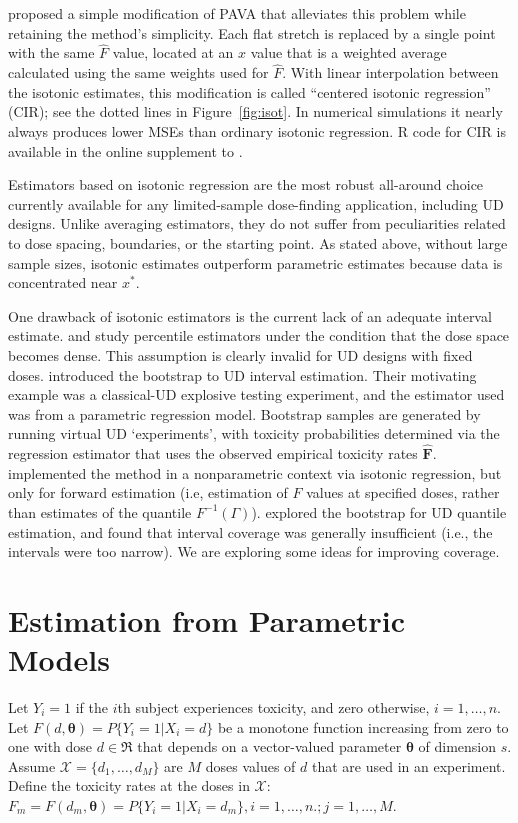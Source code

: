  \cite{Oron07} proposed a simple modification of PAVA that alleviates this problem while retaining the method's simplicity. Each flat stretch is replaced by a single point with the same $\hat{F}$ value, located at an $x$ value that is a weighted average calculated using the same weights used for $\hat{F}$. With linear interpolation between the isotonic estimates, this modification is called ``centered isotonic regression'' (CIR); see the dotted lines in Figure~\ref{fig:isot}. In numerical simulations it nearly always produces lower MSEs than ordinary isotonic regression. R code for CIR is available in the online supplement to \cite{Oron:Hoff:smal:2013}.

Estimators based on isotonic regression are the most robust all-around choice currently available for any limited-sample dose-finding application, including UD designs. Unlike averaging estimators, they do not suffer from peculiarities related to dose spacing, boundaries, or the starting point. As stated above, without large sample sizes, isotonic estimates outperform parametric estimates because  data is concentrated near $x^*$.

One  drawback of isotonic estimators is the current lack of an adequate interval estimate.  \cite{Wright:1984} and \cite{Muke:1993} study percentile estimators under the condition that the dose space becomes dense.  This assumption is clearly invalid for UD designs with fixed doses.  \cite{Chao:Fuh:boot:2001} introduced the bootstrap to UD interval estimation. Their motivating example was a classical-UD explosive testing experiment, and the estimator used was from a parametric regression model. Bootstrap samples are generated by running virtual UD `experiments', with toxicity probabilities determined via the regression estimator that uses the observed empirical toxicity rates $\mathbf{\hat{F}}$.  \cite{Styl:Pros:Flou:esti:2003} implemented the method in a nonparametric context via isotonic regression, but only for forward estimation (i.e, estimation of $F$ values at specified doses, rather than estimates of the quantile $F^{-1}(\Gamma)$). \cite{Oron07} explored the bootstrap for UD quantile estimation, and found that interval coverage was generally insufficient (i.e., the intervals were too narrow). We are exploring some ideas for improving coverage.


\section{Estimation from Parametric Models}
Let $Y_i=1$ if the $i$th subject experiences toxicity, and zero otherwise, $i=1,\ldots,n$. Let $F(d,\boldsymbol{\theta})=P\{Y_i=1|X_i=d\}$ be a monotone function increasing from zero to one with dose $d\in \Re $ that depends on  a vector-valued parameter $\boldsymbol{\theta}$ of dimension $s$.   Assume $\mathcal{X}=\{d_1,\ldots,d_M\}$ are $M$ doses values of $d$ that are used in an experiment.  Define the toxicity rates at the doses in $\mathcal{X}$: $F_m=F(d_m,\boldsymbol{\theta})=P\{Y_i=1|X_i=d_m\},i=1,\ldots,n.; j=1,\ldots,M.$  


